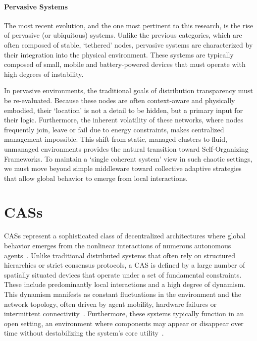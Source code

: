 \paragraph{Pervasive Systems}
The most recent evolution, and the one most pertinent to this research, is the rise of pervasive (or ubiquitous) systems. Unlike the previous categories, which are often composed of stable, `tethered' nodes, pervasive systems are characterized by their integration into the physical environment. These systems are typically composed of small, mobile and battery-powered devices that must operate with high degrees of instability.

In pervasive environments, the traditional goals of distribution transparency must be re-evaluated. Because these nodes are often context-aware and physically embodied, their `location' is not a detail to be hidden, but a primary input for their logic. Furthermore, the inherent volatility of these networks, where nodes frequently join, leave or fail due to energy constraints, makes centralized management impossible. This shift from static, managed clusters to fluid, unmanaged environments provides the natural transition toward Self-Organizing Frameworks. To maintain a `single coherent system' view in such chaotic settings, we must move beyond simple middleware toward collective adaptive strategies that allow global behavior to emerge from local interactions.

\section{\aclp{CAS}}

\aclp{CAS} represent a sophisticated class of decentralized architectures where global behavior emerges from the nonlinear interactions of numerous autonomous agents~\cite{holland1992adaptation}. Unlike traditional distributed systems that often rely on structured hierarchies or strict consensus protocols, a \ac{CAS} is defined by a large number of spatially situated devices that operate under a set of fundamental constraints. These include predominantly local interactions and a high degree of dynamism. This dynamism manifests as constant fluctuations in the environment and the network topology, often driven by agent mobility, hardware failures or intermittent connectivity~\cite{DBLP:journals/csur/Casadei23}. Furthermore, these systems typically function in an open setting, an environment where components may appear or disappear over time without destabilizing the system's core utility~\cite{DBLP:journals/jlap/ViroliBDACP19}.

